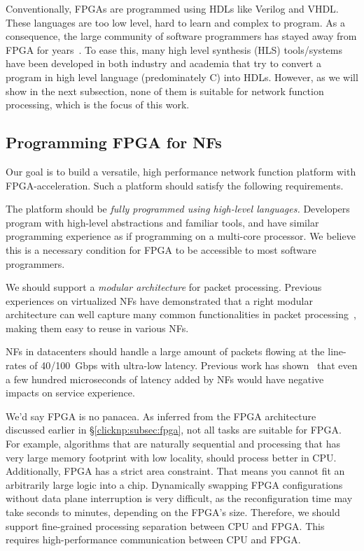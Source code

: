 Conventionally, FPGAs are programmed using HDLs like Verilog and VHDL.
These languages are too low level, hard to learn and complex to program.
As a consequence, the large community of software programmers has stayed away from FPGA for years~\cite{bacon2013fpga}. 
To ease this, many high level synthesis (HLS) 
tools/systems have been developed in
both industry and academia that try to convert a program in high level
language (predominately C) into HDLs. 
However, as we will show in the next subsection, none of them is 
suitable for network function processing, which is the focus of this work.


\subsection{Programming FPGA for NFs}

Our goal is to build a versatile, high performance network function 
platform with FPGA-acceleration. Such a platform should satisfy 
the following requirements.

 The platform should be 
\textit{fully programmed using high-level languages.} 
Developers program with high-level abstractions and familiar tools, and
have similar programming experience as if programming on a multi-core processor.
We believe this is a necessary condition for FPGA to be accessible to
most software programmers.

 We should support a \textit{modular architecture}
for packet processing. Previous experiences on virtualized NFs
have demonstrated that a right modular architecture can well capture many common 
functionalities in packet processing~\cite{kohler2000click,martins2014clickos},
making them easy to reuse in various NFs.

 NFs in datacenters
should handle a large amount of packets flowing at the line-rates of 40/100~Gbps
with ultra-low latency. Previous work has shown~\cite{rollback-mb} that even a few
hundred microseconds of latency added by NFs would have 
negative impacts on service experience.

 We'd say FPGA is no panacea. 
As inferred from the FPGA architecture discussed earlier in \S\ref{clicknp:subsec:fpga}, not all tasks are 
suitable for FPGA. For example, algorithms that are naturally sequential and
processing that has very large memory footprint with low locality, should process  
better in CPU.
Additionally, FPGA has a strict area constraint. 
That means you cannot fit an arbitrarily large logic into a chip.
Dynamically swapping FPGA configurations without data plane interruption
is very difficult, as the reconfiguration time may take
seconds to minutes, depending on the FPGA's size.
%
Therefore, we should support fine-grained processing 
separation between CPU and FPGA. This requires high-performance communication 
between CPU and FPGA.


